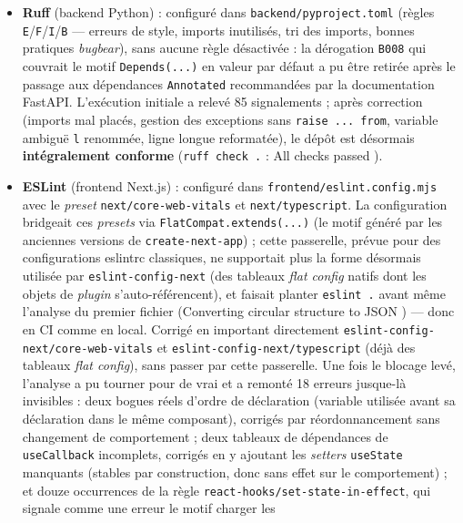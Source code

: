 \documentclass[12pt, a4paper]{report}
\renewcommand{\_}{\origunderscore\allowbreak}
\begin{document}
\begin{itemize}
    \item \textbf{Ruff} (backend Python) : configuré dans \texttt{backend/pyproject.toml}
    (règles \texttt{E}/\texttt{F}/\texttt{I}/\texttt{B} — erreurs de style, imports inutilisés,
    tri des imports, bonnes pratiques \textit{bugbear}), sans aucune règle désactivée : la
    dérogation \texttt{B008} qui couvrait le motif \texttt{Depends(...)} en valeur par défaut a
    pu être retirée après le passage aux dépendances \texttt{Annotated} recommandées par la
    documentation FastAPI. L'exécution initiale a
    relevé 85 signalements ; après correction (imports mal placés, gestion des exceptions sans
    \texttt{raise ... from}, variable ambiguë \texttt{l} renommée, ligne longue reformatée), le
    dépôt est désormais \textbf{intégralement conforme} (\texttt{ruff check .} : \og All checks
    passed \fg{}).
    \item \textbf{ESLint} (frontend Next.js) : configuré dans \texttt{frontend/\allowbreak eslint.config.mjs}
    avec le \textit{preset} \texttt{next/core-web-vitals} et \texttt{next/typescript}. La
    configuration bridgeait ces \textit{presets} via \texttt{FlatCompat.extends(...)} (le motif
    généré par les anciennes versions de \texttt{create-next-app}) ; cette passerelle, prévue pour
    des configurations \og eslintrc \fg{} classiques, ne supportait plus la forme désormais
    utilisée par \texttt{eslint-config-next} (des tableaux \textit{flat config} natifs dont les
    objets de \textit{plugin} s'auto-référencent), et faisait planter \texttt{eslint .} avant même
    l'analyse du premier fichier (\og Converting circular structure to JSON \fg{}) — donc en CI
    comme en local. Corrigé en important directement \texttt{eslint-config-next/\allowbreak core-web-vitals}
    et \texttt{eslint-config-next/\allowbreak typescript} (déjà des tableaux \textit{flat config}), sans passer
    par cette passerelle. Une fois le blocage levé, l'analyse a pu tourner pour de vrai et a
    remonté 18 erreurs jusque-là invisibles : deux bogues réels d'ordre de déclaration (variable
    utilisée avant sa déclaration dans le même composant), corrigés par réordonnancement sans
    changement de comportement ; deux tableaux de dépendances de \texttt{useCallback} incomplets,
    corrigés en y ajoutant les \textit{setters} \texttt{useState} manquants (stables par
    construction, donc sans effet sur le comportement) ; et douze occurrences de la règle
    \texttt{react-hooks/\allowbreak set-state-in-effect}, qui signale comme une erreur le motif \og charger les

\end{itemize}
\end{document}
